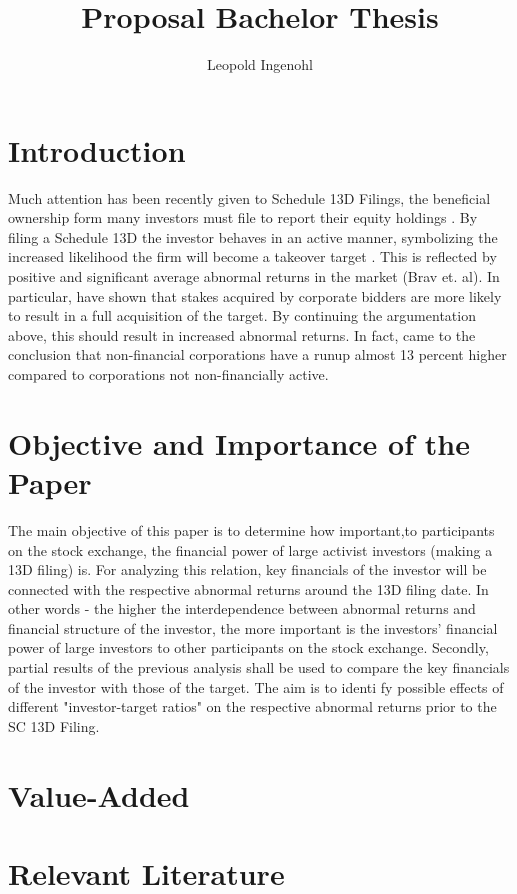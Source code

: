 \documentclass[11pt,openright]{article}
\title{Proposal Bachelor Thesis}
\author{Leopold Ingenohl}
\begin{document}
\maketitle

\section{Introduction}
Much attention has been recently given to Schedule 13D Filings, the beneficial ownership form many investors must file to report their equity holdings \citep{Giglia2018}. By filing a Schedule 13D the investor behaves in an active manner, symbolizing the increased likelihood the firm will become a takeover target \citep{Brigida2012}. This is reflected by positive and significant average abnormal returns in the market (Brav et. al). In particular, \citet{Akhigbe2007} have shown that stakes acquired by corporate bidders are more likely to result in a full acquisition of the target. By continuing the argumentation above, this should result in increased abnormal returns.  In fact, \citet{Brigida2012} came to the conclusion that non-financial corporations have a runup  almost 13 percent higher compared to corporations not non-financially active.


\section{Objective and Importance of the Paper}
The main objective of this paper is to determine how important,to participants on the stock exchange, the financial power of large activist investors (making a 13D filing) is. For analyzing this relation, key financials of the investor will be connected with the respective abnormal returns around the 13D filing date. In other words - the higher the interdependence between abnormal returns and financial structure of the investor, the more important is the investors' financial power of large investors to other participants on the stock exchange.
Secondly, partial results of the previous analysis shall be used to compare the key financials of the investor with those of the target. The aim is to identi fy possible effects of different "investor-target ratios" on the respective abnormal returns prior to the SC 13D Filing. 

\section{Value-Added}

\section{Relevant Literature}
\end{document}
